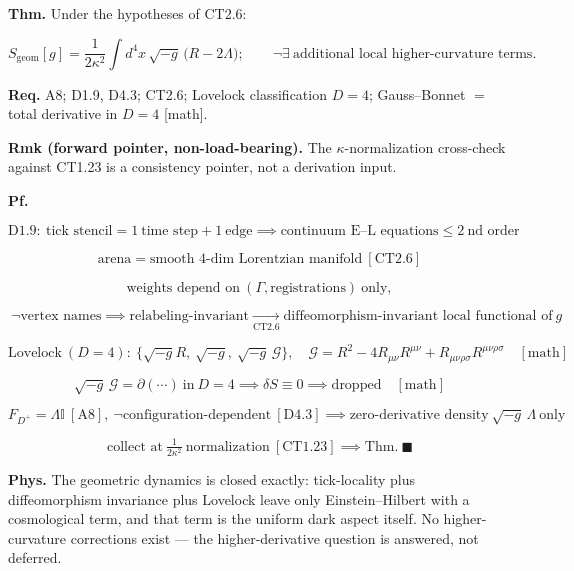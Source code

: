 \begin{theorem}\label{tag:CT2-7}
\textbf{Thm.} Under the hypotheses of CT2.6:

\[
S_{\mathrm{geom}}[g]=\frac{1}{2\kappa^2}\int d^4x\,\sqrt{-g}\,\bigl(R-2\Lambda\bigr);\qquad
\neg\exists\ \text{additional local higher-curvature terms}.
\]

\textbf{Req.} A8; D1.9, D4.3; CT2.6; Lovelock classification $D=4$; Gauss–Bonnet $=$ total derivative in $D=4$ [math].

\textbf{Rmk (forward pointer, non-load-bearing).} The $\kappa$-normalization cross-check against CT1.23 is a consistency pointer, not a derivation input.

\textbf{Pf.}

\[
\mathrm{D1.9}:\ \text{tick stencil}=1\ \text{time step}+1\ \text{edge}\implies\text{continuum E--L equations}\le2\ \text{nd order}
\]

\[
\text{arena}=\text{smooth 4-dim Lorentzian manifold}\ [\mathrm{CT2.6}]
\]

\[
\text{weights depend on}\ (\Gamma,\text{registrations})\ \text{only},
\]

\[
\ \neg\text{vertex names}\implies\text{relabeling-invariant}\xrightarrow[\mathrm{CT2.6}]{}\text{diffeomorphism-invariant local functional of}\ g
\]

\[
\text{Lovelock}\ (D=4):\ \bigl\{\sqrt{-g}R,\ \sqrt{-g},\ \sqrt{-g}\,\mathcal G\bigr\},\quad\mathcal G=R^2-4R_{\mu\nu}R^{\mu\nu}+R_{\mu\nu\rho\sigma}R^{\mu\nu\rho\sigma}\quad[\text{math}]
\]

\[
\sqrt{-g}\,\mathcal G=\partial(\cdots)\ \text{in}\ D=4\implies\delta S\equiv0\implies\text{dropped}\quad[\text{math}]
\]

\[
F_{D^+}=\Lambda\mathbb I\ [\mathrm{A8}],\ \neg\text{configuration-dependent}\ [\mathrm{D4.3}]\implies\text{zero-derivative density}\ \sqrt{-g}\,\Lambda\ \text{only}
\]

\[
\text{collect at}\ \tfrac{1}{2\kappa^2}\ \text{normalization}\ [\mathrm{CT1.23}]\implies\text{Thm}.\ \blacksquare
\]

\textbf{Phys.} The geometric dynamics is closed exactly: tick-locality plus diffeomorphism invariance plus Lovelock leave only Einstein–Hilbert with a cosmological term, and that term is the uniform dark aspect itself. No higher-curvature corrections exist — the higher-derivative question is answered, not deferred.

\end{theorem}

